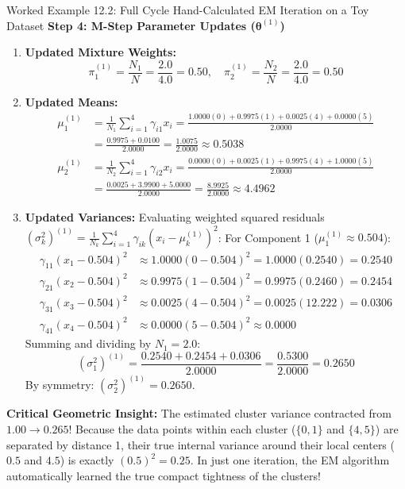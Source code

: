 \begin{examplebox}[breakable]{Worked Example 12.2: Full Cycle Hand-Calculated EM Iteration on a Toy Dataset}
\textbf{Step 4: M-Step Parameter Updates ($\boldsymbol{\theta}^{(1)}$)}
\begin{enumerate}
    \item \textbf{Updated Mixture Weights:}
    \begin{equation}
    \pi_1^{(1)} = \frac{N_1}{N} = \frac{2.0}{4.0} = \mathbf{0.50}, \quad \pi_2^{(1)} = \frac{N_2}{N} = \frac{2.0}{4.0} = \mathbf{0.50}
    \end{equation}
    \item \textbf{Updated Means:}
    \begin{align}
    \mu_1^{(1)} &= \frac{1}{N_1}\sum_{i=1}^4 \gamma_{i1} x_i = \frac{1.0000(0) + 0.9975(1) + 0.0025(4) + 0.0000(5)}{2.0000} \nonumber \\
    &= \frac{0.9975 + 0.0100}{2.0000} = \frac{1.0075}{2.0000} \approx \mathbf{0.5038} \\
    \mu_2^{(1)} &= \frac{1}{N_2}\sum_{i=1}^4 \gamma_{i2} x_i = \frac{0.0000(0) + 0.0025(1) + 0.9975(4) + 1.0000(5)}{2.0000} \nonumber \\
    &= \frac{0.0025 + 3.9900 + 5.0000}{2.0000} = \frac{8.9925}{2.0000} \approx \mathbf{4.4962}
    \end{align}
    \item \textbf{Updated Variances:}
    Evaluating weighted squared residuals $(\sigma_k^2)^{(1)} = \frac{1}{N_k}\sum_{i=1}^4 \gamma_{ik}(x_i - \mu_k^{(1)})^2$:
    For Component 1 ($\mu_1^{(1)} \approx 0.504$):
    \begin{align}
    \gamma_{11}(x_1 - 0.504)^2 &\approx 1.0000(0 - 0.504)^2 = 1.0000(0.2540) = 0.2540 \\
    \gamma_{21}(x_2 - 0.504)^2 &\approx 0.9975(1 - 0.504)^2 = 0.9975(0.2460) = 0.2454 \\
    \gamma_{31}(x_3 - 0.504)^2 &\approx 0.0025(4 - 0.504)^2 = 0.0025(12.222) = 0.0306 \\
    \gamma_{41}(x_4 - 0.504)^2 &\approx 0.0000(5 - 0.504)^2 \approx 0.0000
    \end{align}
    Summing and dividing by $N_1 = 2.0$:
    \begin{equation}
    (\sigma_1^2)^{(1)} = \frac{0.2540 + 0.2454 + 0.0306}{2.0000} = \frac{0.5300}{2.0000} = \mathbf{0.2650}
    \end{equation}
    By symmetry: $(\sigma_2^2)^{(1)} = \mathbf{0.2650}$.
\end{enumerate}
\textbf{Critical Geometric Insight:} The estimated cluster variance contracted from $1.00 \to 0.265$! Because the data points within each cluster ($\{0, 1\}$ and $\{4, 5\}$) are separated by distance 1, their true internal variance around their local centers ($0.5$ and $4.5$) is exactly $(0.5)^2 = 0.25$. In just one iteration, the EM algorithm automatically learned the true compact tightness of the clusters!


\end{examplebox}
